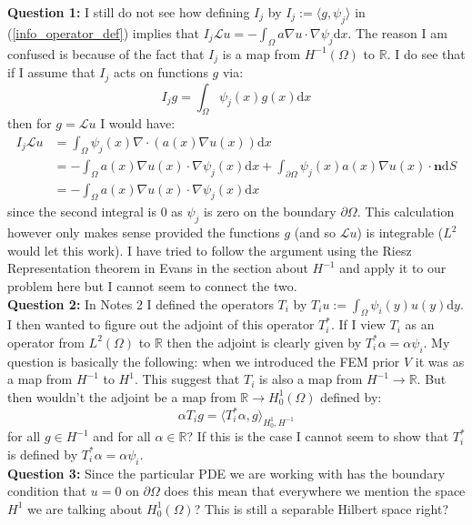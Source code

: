 \documentclass{article}
\theoremstyle{definition}
\theoremstyle{remark}
\begin{document}
\noindent \textbf{Question 1:} I still do not see how defining $I_j$ by $I_j:=\langle g, \psi_j \rangle$ in (\ref{info_operator_def}) implies that $I_{j}\mathcal{L}u=-\int_{\Omega}a\nabla u \cdot \nabla\psi_{j}\mathrm{d}x$. The reason I am confused is because of the fact that $I_j$ is a map from $H^{-1}(\Omega)$ to $\mathbb{R}$. I do see that if I assume that $I_{j}$ acts on functions $g$ via:
\begin{equation*}
    I_{j}g=\int_{\Omega}\psi_{j}(x)g(x)\mathrm{d}x
\end{equation*}
then for $g=\mathcal{L}u$ I would have:
\begin{align*}
    I_{j}\mathcal{L}u&=\int_{\Omega}\psi_{j}(x)\nabla\cdot(a(x)\nabla u(x))\mathrm{d}x \\
    &=-\int_{\Omega}a(x)\nabla u(x)\cdot\nabla\psi_{j}(x)\mathrm{d}x + \int_{\partial\Omega}\psi_{j}(x)a(x)\nabla u(x)\cdot\mathbf{n}\mathrm{d}S \\
    &=-\int_{\Omega}a(x)\nabla u(x)\cdot\nabla\psi_{j}(x)\mathrm{d}x
\end{align*}
since the second integral is $0$ as $\psi_j$ is zero on the boundary $\partial\Omega$. This calculation however only makes sense provided the functions $g$ (and so $\mathcal{L}u$) is integrable ($L^2$ would let this work). I have tried to follow the argument using the Riesz Representation theorem in Evans in the section about $H^{-1}$ and apply it to our problem here but I cannot seem to connect the two. \\

\noindent \textbf{Question 2:} In Notes 2 I defined the operators $T_{i}$ by $T_{i}u:=\int_{\Omega}\psi_{i}(y)u(y)\mathrm{d}y$. I then wanted to figure out the adjoint of this operator $T_{i}^{*}$. If I view $T_{i}$ as an operator from $L^{2}(\Omega)$ to $\mathbb{R}$ then the adjoint is clearly given by $T_{i}^{*}\alpha=\alpha \psi_{i}$. My question is basically the following: when we introduced the FEM prior $V$ it was as a map from $H^{-1}$ to $H^{1}$. This suggest that $T_{i}$ is also a map from $H^{-1}\rightarrow\mathbb{R}$. But then wouldn't the adjoint be a map from $\mathbb{R}\rightarrow H_{0}^{1}(\Omega)$ defined by:
\begin{equation*}
    \alpha T_{i}g=\langle T_{i}^{*}\alpha, g \rangle_{H_{0}^{1},H^{-1}}
\end{equation*}
for all $g\in H^{-1}$ and for all $\alpha \in \mathbb{R}$? If this is the case I cannot seem to show that $T_{i}^{*}$ is defined by $T_{i}^{*}\alpha=\alpha \psi_{i}$. \\

\noindent \textbf{Question 3:} Since the particular PDE we are working with has the boundary condition that $u=0$ on $\partial\Omega$ does this mean that everywhere we mention the space $H^1$ we are talking about $H_{0}^{1}(\Omega)$? This is still a separable Hilbert space right?





\end{document}
